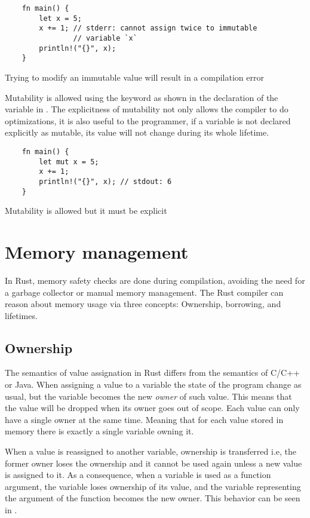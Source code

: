 \begin{listing}[h]
	\begin{verbatim}
    fn main() {
        let x = 5;
        x += 1; // stderr: cannot assign twice to immutable 
                // variable `x`
        println!("{}", x);
    }
	\end{verbatim}
  \caption{Trying to modify an immutable value will result in a compilation error}
  \label{lst:immutable}
\end{listing}

Mutability is allowed using the  keyword as shown in the
declaration of the variable  in . The explicitness
of mutability not only allows the compiler to do optimizations, it is also
useful to the programmer, if a variable is not declared explicitly as mutable,
its value will not change during its whole lifetime.

\begin{listing}[h]
	\begin{verbatim}
    fn main() {
        let mut x = 5;
        x += 1;
        println!("{}", x); // stdout: 6 
    }
	\end{verbatim}
  \caption{Mutability is allowed but it must be explicit}
  \label{lst:mutable}
\end{listing}

\section{Memory management}
In Rust, memory safety checks are done during compilation, avoiding the need for
a garbage collector or manual memory management. The Rust compiler can reason
about memory usage via three concepts: Ownership, borrowing, and lifetimes.

\subsection{Ownership}
The semantics of value assignation in Rust differs from the semantics of C/C++
or Java. When assigning a value to a variable the state of the program change as
usual, but the variable becomes the new \textit{owner} of such value.
\cite{ownership_types} This means that the value will be dropped when its owner
goes out of scope. Each value can only have a single owner at the same time.
Meaning that for each value stored in memory there is exactly a single variable
owning it. 

When a value is reassigned to another variable, ownership is transferred i.e,
the former owner loses the ownership and it cannot be used again unless a new
value is assigned to it. As a consequence, when a variable is used as a function
argument, the variable loses ownership of its value, and the variable
representing the argument of the function becomes the new owner. This behavior
can be seen in .

